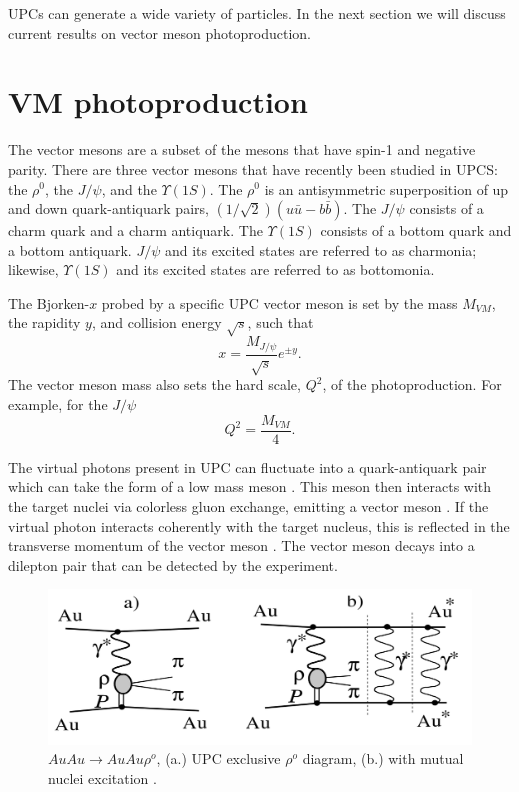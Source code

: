 UPCs can generate a wide variety of particles. In the next section we will discuss current results on vector meson photoproduction.

\section{VM photoproduction}
The vector mesons are a subset of the mesons that have spin-1 and negative parity. There are three vector mesons that have recently been studied in UPCS: the $\rho^0$, the $J/\psi$, and the $\Upsilon(1S)$. The $\rho^0$ is an antisymmetric superposition of up and down quark-antiquark pairs, $(1/\sqrt{2})(u\bar{u}-b\bar{b})$. The $J/\psi$ consists of a charm quark and a charm antiquark. The $\Upsilon(1S)$ consists of a bottom quark and a bottom antiquark. $J/\psi$ and its excited states are referred to as charmonia; likewise, $\Upsilon(1S)$ and its excited states are referred to as bottomonia.

The Bjorken-$x$ probed by a specific UPC vector meson is set by the mass $M_{VM}$, the rapidity $y$, and collision energy $\sqrt{s}$, such that
\begin{equation}
x = \frac{M_{J/\psi}}{\sqrt{s}}e^{\pm y}.
\end{equation} The vector meson mass also sets the hard scale, $Q^2$, of the photoproduction. For example, for the $J/\psi$
\begin{equation}
Q^2 = \frac{M_{VM}}{4}.
\end{equation}

The virtual photons present in UPC can fluctuate into a quark-antiquark pair which can take the form of a low mass meson \cite{lta2011.09,Chekanov:2002xi,Klasen:2007pm}. This meson then interacts with the target nuclei via colorless gluon exchange, emitting a vector meson \cite{Emling:1994gu,dePassos:2001dc,Ryskin:1992ui,Goldhaber:1948zza}. If the virtual photon interacts coherently with the target nucleus, this is reflected in the transverse momentum of the vector meson \cite{Goncalves:2011vf}. The vector meson decays into a dilepton pair that can be detected by the experiment.

\begin{figure}[h!]
\begin{centering}
\includegraphics[width=5.5in]{Chapter2/importfigs/upc_star_diagram.png}
\par\end{centering}
\caption{$AuAu \rightarrow AuAu\rho^o$, (a.) UPC exclusive $\rho^o$ diagram, (b.) with mutual nuclei excitation \cite{Adler:2002sc}. \label{fig:upcRhoStar}}
\end{figure}

